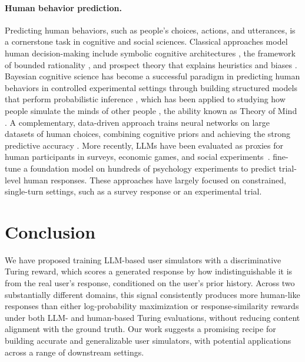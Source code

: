 \documentclass{article} %
\begin{document}
\paragraph{Human behavior prediction.} Predicting human behaviors, such as people's choices, actions, and utterances, is a cornerstone task in cognitive and social sciences. Classical approaches model human decision-making include symbolic cognitive architectures \citep{newell1994unified, anderson2013adaptive}, the framework of bounded rationality \citep{simon1955behavioral}, and prospect theory that explains heuristics and biases \citep{kahneman2013prospect}. Bayesian cognitive science has become a successful paradigm in predicting human behaviors in controlled experimental settings through building structured models that perform probabilistic inference \citep{griffiths2024bayesian}, which has been applied to studying how people simulate the minds of other people \citep{baker2009action, baker2017rational}, the ability known as Theory of Mind \citep{frith2005theory}.
A complementary, data-driven approach trains neural networks on large datasets of human choices, combining cognitive priors and achieving the strong predictive accuracy \citep{bourgin2019cognitive, peterson2021using}. More recently, LLMs have been evaluated as proxies for human participants in surveys, economic games, and social experiments~\citep{argyle2023out, horton2023large, aher2023using, park2024generative}. \citet{binz2025foundation} fine-tune a foundation model on hundreds of psychology experiments to predict trial-level human responses. These approaches have largely focused on constrained, single-turn settings, such as a survey response or an experimental trial. 

\section{Conclusion}

We have proposed training LLM-based user simulators with a discriminative Turing reward, which scores a generated response by how indistinguishable it is from the real user's response, conditioned on the user's prior history. Across two substantially different domains, this signal consistently produces more human-like responses than either log-probability maximization or response-similarity rewards under both LLM- and human-based Turing evaluations, without reducing content alignment with the ground truth. 
Our work suggests a promising recipe for building accurate and generalizable user simulators, with potential applications across a range of downstream settings. 
\end{document}
